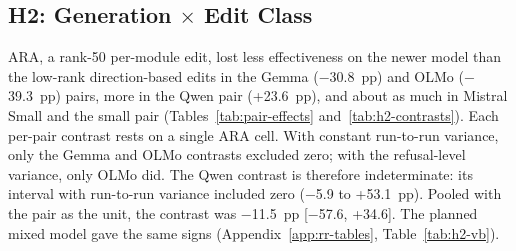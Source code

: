 

\subsection{H2: Generation \texorpdfstring{$\times$}{x} Edit Class}
\label{sec:res-h2}

ARA, a rank-50 per-module edit, lost less effectiveness on the newer model
than the low-rank direction-based edits in the Gemma ($-$30.8~pp) and OLMo
($-$39.3~pp) pairs, more in the Qwen pair (+23.6~pp), and about as much in
Mistral Small and the small pair (Tables~\ref{tab:pair-effects}
and~\ref{tab:h2-contrasts}). Each per-pair contrast rests on a single ARA cell.
With constant run-to-run variance, only the Gemma and OLMo contrasts excluded
zero; with the refusal-level variance, only OLMo did. The Qwen contrast is
therefore indeterminate: its interval with run-to-run variance included zero
($-$5.9 to +53.1~pp). Pooled with the pair as the unit, the contrast was
$-$11.5~pp [$-$57.6, +34.6]. The planned mixed model gave the same signs
(Appendix~\ref{app:rr-tables}, Table~\ref{tab:h2-vb}).

